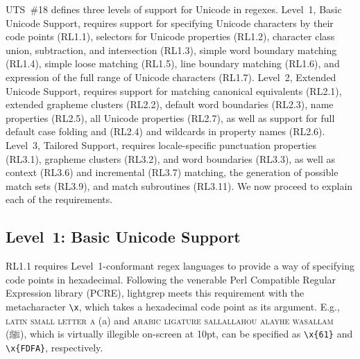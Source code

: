 \documentclass[5p,final,number,sort&compress]{elsarticle}
\newcommand{\re}[1]{\texttt{#1}}
\newcommand*{\whack}{\textbackslash}
\begin{document}
UTS~\#18 defines three levels of support for Unicode in regexes. Level~1, Basic Unicode Support, requires support for specifying Unicode characters by their code points (RL1.1), selectors for Unicode properties (RL1.2), character class union, subtraction, and intersection (RL1.3), simple word boundary matching (RL1.4), simple loose matching (RL1.5), line boundary matching (RL1.6), and expression of the full range of Unicode characters (RL1.7). Level~2, Extended Unicode Support, requires support for matching canonical equivalents (RL2.1), extended grapheme clusters (RL2.2), default word boundaries (RL2.3), name properties (RL2.5), all Unicode properties (RL2.7), as well as support for full default case folding and (RL2.4) and wildcards in property names (RL2.6). Level~3, Tailored Support, requires locale-specific punctuation properties (RL3.1), grapheme clusters (RL3.2), and word boundaries (RL3.3), as well as context (RL3.6) and incremental (RL3.7) matching, the generation of possible match sets (RL3.9), and match subroutines (RL3.11). We now proceed to explain each of the requirements.

\subsection{Level~1: Basic Unicode Support}

RL1.1 requires Level~1-conformant regex languages to provide a way of specifying code points in hexadecimal. Following the venerable Perl Compatible Regular Expression library (PCRE), lightgrep meets this requirement with the metacharacter \re{\whack x}, which takes a hexadecimal code point as its argument. E.g., \textsc{latin small letter a} (a) and \textsc{arabic ligature sallallahou alayhe wasallam} ({ﷺ}), which is virtually illegible on-screen at 10pt, can be specified as \re{\whack x\{61\}} and \re{\whack x\{FDFA\}}, respectively.
\end{document}
